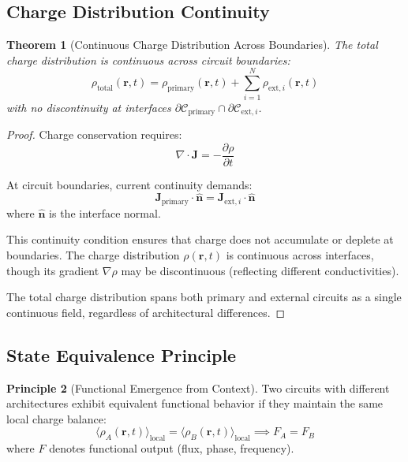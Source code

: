 \documentclass[12pt,a4paper]{article}
\theoremstyle{plain}
\newtheorem{theorem}{Theorem}[section]
\theoremstyle{definition}
\newtheorem{principle}[theorem]{Principle}
\theoremstyle{remark}
\begin{document}
\subsection{Charge Distribution Continuity}

\begin{theorem}[Continuous Charge Distribution Across Boundaries]
\label{thm:charge_continuity}
The total charge distribution is continuous across circuit boundaries:
\begin{equation}
\rho_{\text{total}}(\mathbf{r},t) = \rho_{\text{primary}}(\mathbf{r},t) + \sum_{i=1}^{N} \rho_{\text{ext},i}(\mathbf{r},t)
\end{equation}
with no discontinuity at interfaces $\partial \mathcal{C}_{\text{primary}} \cap \partial \mathcal{C}_{\text{ext},i}$.
\end{theorem}

\begin{proof}
Charge conservation requires:
\begin{equation}
\nabla \cdot \mathbf{J} = -\frac{\partial \rho}{\partial t}
\end{equation}

At circuit boundaries, current continuity demands:
\begin{equation}
\mathbf{J}_{\text{primary}} \cdot \hat{\mathbf{n}} = \mathbf{J}_{\text{ext},i} \cdot \hat{\mathbf{n}}
\end{equation}
where $\hat{\mathbf{n}}$ is the interface normal.

This continuity condition ensures that charge does not accumulate or deplete at boundaries. The charge distribution $\rho(\mathbf{r},t)$ is continuous across interfaces, though its gradient $\nabla \rho$ may be discontinuous (reflecting different conductivities).

The total charge distribution spans both primary and external circuits as a single continuous field, regardless of architectural differences.
\end{proof}

\subsection{State Equivalence Principle}

\begin{principle}[Functional Emergence from Context]
\label{prin:state_equivalence}
Two circuits with different architectures exhibit equivalent functional behavior if they maintain the same local charge balance:
\begin{equation}
\langle \rho_A(\mathbf{r},t) \rangle_{\text{local}} = \langle \rho_B(\mathbf{r},t) \rangle_{\text{local}} \implies F_A = F_B
\end{equation}
where $F$ denotes functional output (flux, phase, frequency).
\end{principle}
\end{document}
